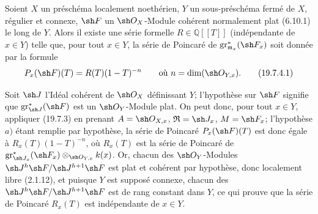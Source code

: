 \begin{corollary}[19.7.4]
\label{IV.19.7.4}
Soient $X$ un préschéma localement noethérien, $Y$ un sous-préschéma fermé de $X$, régulier et connexe, $\sh F$ un $\sh O_X$-Module cohérent normalement plat (6.10.1) le long de $Y$. Alors il existe une série formelle $R\in\mathbb{Q}[[T]]$ (indépendante de $x\in Y$) telle que, pour tout $x\in Y$, la série de Poincaré de $\operatorname{gr}_{\mathfrak m_x}^*(\sh F_x)$ soit donnée par la formule
\begin{equation}
  P_x(\sh F)(T)=R(T)(1-T)^{-n}\qquad\text{où }n=\dim(\sh O_{Y,x}).
  \tag{19.7.4.1}\label{IV.19.7.4.1}
\end{equation}


Soit $\sh J$ l'Idéal cohérent de $\sh O_X$ définissant $Y$; l'hypothèse sur $\sh F$ signifie que $\operatorname{gr}_{\sh J}^*(\sh F)$ est un $\sh O_Y$-Module plat. On peut donc, pour tout $x\in Y$, appliquer (19.7.3) en prenant $A=\sh O_{X,x}$, $\mathfrak R=\sh J_x$, $M=\sh F_x$; l'hypothèse $a)$ étant remplie par hypothèse, la série de Poincaré $P_x(\sh F)(T)$ est donc égale à $R_x(T)(1-T)^{-n}$, où $R_x(T)$ est la série de Poincaré de $\operatorname{gr}_{\sh J_x}^*(\sh F_x)\otimes_{\sh O_{Y,x}}k(x)$. Or, chacun des $\sh O_Y$-Modules $\sh J^h\sh F/\sh J^{h+1}\sh F$ est plat et cohérent par hypothèse, donc localement libre (2.1.12), et puisque $Y$ est supposé connexe, chacun des $\sh J^h\sh F/\sh J^{h+1}\sh F$ est de rang constant dans $Y$, ce qui prouve que la série de Poincaré $R_x(T)$ est indépendante de $x\in Y$.
\end{corollary}

